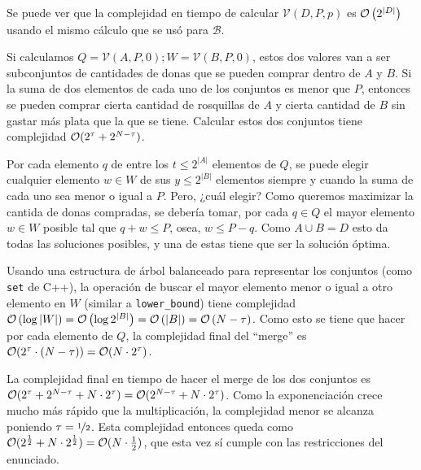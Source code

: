 Se puede ver que la complejidad en tiempo de calcular \( \mathcal{V}(D, P, p) \) es \( \mathcal{O} \left( 2^{\left| D \right|} \right) \) usando el mismo cálculo que se usó para \( \mathcal{B} \).

Si calculamos \( Q = \mathcal{V}(A, P, 0); W = \mathcal{V}(B, P, 0) \), estos dos valores van a ser subconjuntos de cantidades de donas que se pueden comprar dentro de \( A \) y \( B \). Si la suma de dos elementos de cada uno de los conjuntos es menor que \( P \), entonces se pueden comprar cierta cantidad de rosquillas de \( A \) y cierta cantidad de \( B \) sin gastar más plata que la que se tiene. Calcular estos dos conjuntos tiene complejidad \( \mathcal{O}(2^\tau + 2^{N - \tau}) \).

Por cada elemento \( q \) de entre los \( t \leq 2^{\left| A \right|} \) elementos de \( Q \), se puede elegir cualquier elemento \( w \in W \) de sus \( y \leq 2^{\left| B \right|} \) elementos siempre y cuando la suma de cada uno sea menor o igual a \( P \). Pero, ¿cuál elegir? Como queremos maximizar la cantida de donas compradas, se debería tomar, por cada \( q \in Q \) el mayor elemento \( w \in W \) posible tal que \( q + w \leq P \), osea, \( w \leq P - q \). Como \( A \cup B = D \) esto da todas las soluciones posibles, y una de estas tiene que ser la solución óptima.

Usando una estructura de árbol balanceado para representar los conjuntos (como \texttt{set} de C++), la operación de buscar el mayor elemento menor o igual a otro elemento en \( W \) (similar a \texttt{lower\_bound}) tiene complejidad \( \mathcal{O} \left( \log \left| W \right| \right) = \mathcal{O} \left( \log 2^{\left| B \right|} \right) = \mathcal{O} \left( \left| B \right| \right) = \mathcal{O} \left( N - \tau \right) \). Como esto se tiene que hacer por cada elemento de \( Q \), la complejidad final del ``merge'' es \( \mathcal{O} (2^\tau \cdot (N - \tau)) = \mathcal{O} (N \cdot 2^\tau) \).

La complejidad final en tiempo de hacer el merge de los dos conjuntos es \( \mathcal{O}(2^\tau + 2^{N - \tau} + N \cdot 2^\tau) = \mathcal{O}(2^{N - \tau} + N \cdot 2^\tau) \). Como la exponenciación crece mucho más rápido que la multiplicación, la complejidad menor se alcanza poniendo \( \tau = \nicefrac{1}{2} \). Esta complejidad entonces queda como \( \mathcal{O}(2^\frac{1}{2} + N \cdot 2^\frac{1}{2}) = \mathcal{O}(N \cdot \frac{1}{2}) \), que esta vez sí cumple con las restricciones del enunciado.

